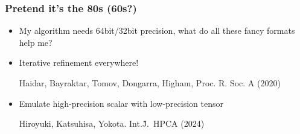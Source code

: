 \documentclass[aspectratio=169]{beamer}
\begin{document}
\begin{frame}
  \frametitle{Pretend it's the 80s (60s?)}
  \begin{itemize}
  \item My algorithm needs 64bit/32bit precision, what do all these fancy
    formats help me?
  \item Iterative refinement everywhere!\\
    {\scriptsize
      \raggedleft
      Haidar, Bayraktar, Tomov, Dongarra, Higham, Proc. R. Soc. A (2020)
      \par}
  \item Emulate high-precision scalar with low-precision tensor\\
    {\scriptsize
      \raggedleft
      Hiroyuki, Katsuhisa, Yokota. Int.\~J.~HPCA (2024)
      \par}
  \end{itemize}
\end{frame}
\end{document}
